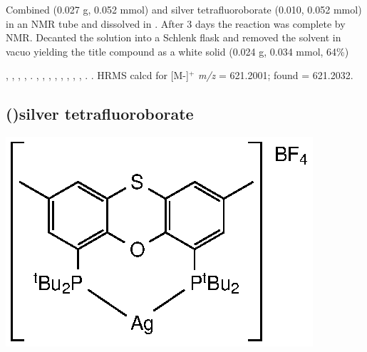 Combined \tBusixantphos{} (0.027 g, 0.052 mmol) and silver tetrafluoroborate (0.010, 0.052 mmol) in an NMR tube and dissolved in .  After 3 days the reaction was complete by NMR.  Decanted the solution into a Schlenk flask and removed the solvent in vacuo yielding the title compound as a white solid (0.024 g, 0.034 mmol, 64\%)

,
,
,
,
.
,
,
,
,
,
,
, %
,
.
.
HRMS calcd for  [M-]$^+$ \emph{m/z} = 621.2001; found = 621.2032.



\subsection*{(\tBuThixantphos)silver tetrafluoroborate}

\begin{structure}[h]
\begin{center}
\includegraphics{../Structures/StBuSilverBF4.eps}
\end{center}
\end{structure}

